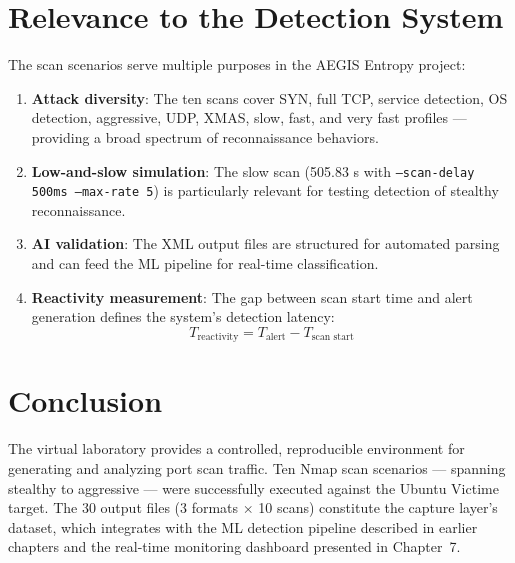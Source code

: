 \section{Relevance to the Detection System}

The scan scenarios serve multiple purposes in the AEGIS Entropy project:

\begin{enumerate}
    \item \textbf{Attack diversity}: The ten scans cover SYN, full TCP, service detection, OS detection, aggressive, UDP, XMAS, slow, fast, and very fast profiles --- providing a broad spectrum of reconnaissance behaviors.
    \item \textbf{Low-and-slow simulation}: The slow scan (505.83 s with \texttt{--scan-delay 500ms --max-rate 5}) is particularly relevant for testing detection of stealthy reconnaissance.
    \item \textbf{AI validation}: The XML output files are structured for automated parsing and can feed the ML pipeline for real-time classification.
    \item \textbf{Reactivity measurement}: The gap between scan start time and alert generation defines the system's detection latency:
    \[
    T_{\text{reactivity}} = T_{\text{alert}} - T_{\text{scan start}}
    \]
\end{enumerate}

\section{Conclusion}

The virtual laboratory provides a controlled, reproducible environment for generating and analyzing port scan traffic. Ten Nmap scan scenarios --- spanning stealthy to aggressive --- were successfully executed against the Ubuntu Victime target. The 30 output files (3 formats $\times$ 10 scans) constitute the capture layer's dataset, which integrates with the ML detection pipeline described in earlier chapters and the real-time monitoring dashboard presented in Chapter~7.
